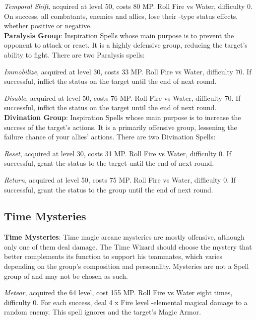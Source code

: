 \begin{multicols}{2}
    \textit{Temporal Shift}, acquired at level 50, costs 80 MP\@. Roll Fire vs Water, difficulty 0. On success, all combatants, enemies and allies, lose their -type status effects, whether positive or negative.\\%
    
    \textbf{Paralysis Group}: Inspiration Spells whose main purpose is to prevent the opponent to attack or react. It is a highly defensive group, reducing the target’s ability to fight. There are two Paralysis spells:
    
    \textit{Immobilize}, acquired at level 30, costs 33 MP\@. Roll Fire vs Water, difficulty 70. If successful, inflict the  status on the target until the end of next round.
    
    \textit{Disable}, acquired at level 50, costs 76 MP\@. Roll Fire vs Water, difficulty 70. If successful, inflict the  status on the target until the end of next round.\\%
    
    \textbf{Divination Group}: Inspiration Spells whose main purpose is to increase the success of the target’s actions. It is a primarily offensive group, lessening the failure chance of your allies’ actions. There are two Divination Spells:
    
    \textit{Reset}, acquired at level 30, costs 31 MP\@. Roll Fire vs Water, difficulty 0. If successful, grant the  status to the target until the end of next round.
    
    \textit{Return}, acquired at level 50, costs 75 MP\@. Roll Fire vs Water, difficulty 0. If successful, grant the  status to the group until the end of next round.
    
    \subsection{Time Mysteries}\label{subsec:time-mysteries}

    \textbf{Time Mysteries}: Time magic arcane mysteries are mostly offensive, although only one of them deal damage. The Time Wizard should choose the mystery that better complements its function to support his teammates, which varies depending on the group’s composition and personality. Mysteries are not a Spell group of and may not be chosen as such.
    
    \textit{Meteor}, acquired the 64 level, cost 155 MP\@. Roll Fire vs Water eight times, difficulty 0. For each success, deal 4 x Fire level -elemental magical damage to a random enemy. This spell ignores  and the target’s Magic Armor.
    

\end{multicols}
